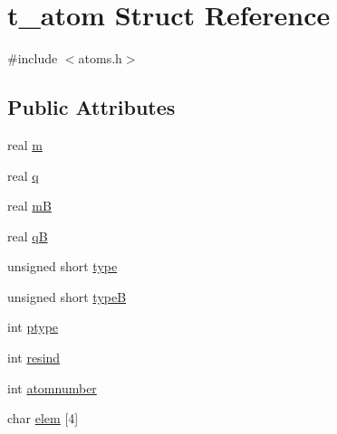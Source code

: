 \hypertarget{structt__atom}{\section{t\-\_\-atom \-Struct \-Reference}
\label{structt__atom}
}


{\ttfamily \#include $<$atoms.\-h$>$}

\subsection*{\-Public \-Attributes}
\begin{DoxyCompactItemize}
\item 
real \hyperlink{structt__atom_a251edd44fc9d9e00b48a175a8753427b}{m}
\item 
real \hyperlink{structt__atom_aa3480cb017c3bb1297e68d141654e216}{q}
\item 
real \hyperlink{structt__atom_a1e42dd1e44adae7a4e75fef4da528100}{m\-B}
\item 
real \hyperlink{structt__atom_a932d3f97cca81039934fe8ebe0f314eb}{q\-B}
\item 
unsigned short \hyperlink{structt__atom_ac44742a0ac2c22eb3a9a3a8835257613}{type}
\item 
unsigned short \hyperlink{structt__atom_aa599512dd98710740379badce45bebac}{type\-B}
\item 
int \hyperlink{structt__atom_a461ee3f835644cb67c8dbd1c62294171}{ptype}
\item 
int \hyperlink{structt__atom_acc3bf5622db75ca3187afda78c107f92}{resind}
\item 
int \hyperlink{structt__atom_a41b85909dad96f4cc1e242ac755124fd}{atomnumber}
\item 
char \hyperlink{structt__atom_a0e2204207704f144f602b9d5a0a2df3a}{elem} \mbox{[}4\mbox{]}
\end{DoxyCompactItemize}


